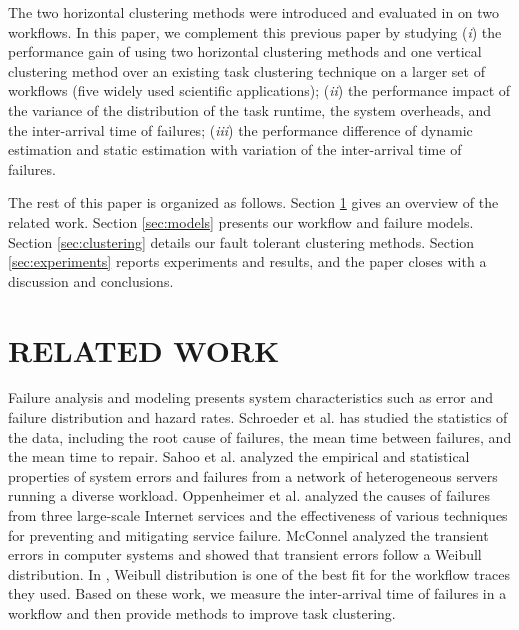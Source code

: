 \documentclass{IOS-Book-Article}
\begin{document}
The two horizontal clustering methods were introduced and evaluated in \cite{Chen2012} on two workflows. In this paper, we complement this previous paper by studying (\emph{i}) the performance gain of using two horizontal clustering methods and one vertical clustering method over an existing task clustering technique on a larger set of workflows (five widely used scientific applications); (\emph{ii}) the performance impact of the variance of the distribution of the task runtime, the system overheads, and the inter-arrival time of failures; (\emph{iii}) the performance difference of dynamic estimation and static estimation with variation of the inter-arrival time of failures.  

The rest of this paper is organized as follows. Section \ref{sec:related} gives an overview of the related work. Section \ref{sec:models} presents our workflow and failure models. Section \ref{sec:clustering} details our fault tolerant clustering methods. Section \ref{sec:experiments} reports experiments and results, and the paper closes with a discussion and conclusions. 



\section{RELATED WORK}
\label{sec:related}

Failure analysis and modeling \cite{Tang1990} presents system characteristics such as error and failure distribution and hazard rates. Schroeder et al. \cite{Schroeder2006} has studied the statistics of the data, including the root cause of failures, the mean time between failures, and the mean time to repair. Sahoo et al. \cite{Sahoo2004} analyzed the empirical and statistical properties of system errors and failures from a network of heterogeneous servers running a diverse workload. Oppenheimer et al. \cite{Oppenheimer2002} analyzed the causes of failures from three large-scale Internet services and the effectiveness of various techniques for preventing and mitigating service failure. McConnel \cite{McConnel} analyzed the transient errors in computer systems and showed that transient errors follow a Weibull distribution. In \cite{Sun2003, Iosup2008}, Weibull distribution is one of the best fit for the workflow traces they used.  Based on these work, we measure the inter-arrival time of failures in a workflow and then provide methods to improve task clustering.  
\end{document}
